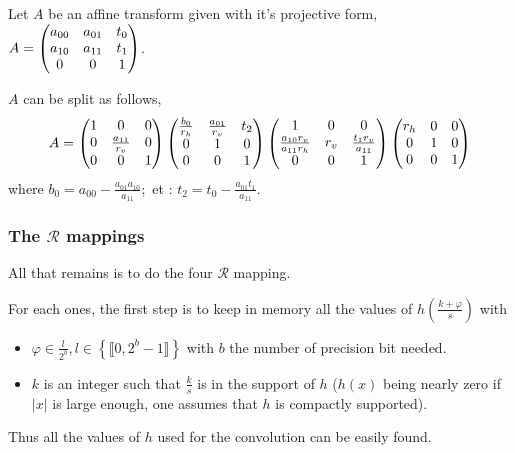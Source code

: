 		\begin{prop}
		\label{propositionDecompositionAffinite}
		Let $A$ be an affine transform given with it's projective form, $A = \begin{pmatrix} a_{00} & a_{01} & t_0\\ a_{10} & a_{11} & t_1\\ 0&0&1 \end{pmatrix}$.
		
		$A$ can be split as follows,
		\[
			A = 
			\begin{pmatrix} 1 & 0 & 0\\ 0 & \frac{a_{11}}{r_v} & 0\\ 0 & 0 & 1 \end{pmatrix}
			\begin{pmatrix} \frac{b_{0}}{r_h} & \frac{a_{01}}{r_v} & t_2\\ 0 & 1 & 0\\ 0 & 0 & 1 \end{pmatrix}
			\begin{pmatrix} 1 & 0 & 0\\ \frac{a_{10}r_v}{a_{11}r_h} & r_v & \frac{t_1r_v}{a_{11}}\\ 0 & 0 & 1 \end{pmatrix}
			\begin{pmatrix} r_h & 0 & 0\\ 0 & 1 & 0\\ 0 & 0 & 1 \end{pmatrix}
		\]
where $b_0 = a_{00} - \frac{a_{01}a_{10}}{a_{11}};$ et : $t_2 = t_0 - \frac{a_{01}t_1}{a_{11}}$.
\end{prop}
	\subsubsection{The $\mathcal R$ mappings}
		
		All that remains is to do the four $\mathcal R$ mapping.
		
		For each ones, the first step is to keep in memory all the values of $h(\frac{k+\varphi}{s})$ with
		
\begin{itemize}
		\item $\varphi \in  \frac{l}{2^b}, l \in \left\lbrace \llbracket 0,2^b-1\rrbracket \right\rbrace$ with $b$ the number of precision bit needed.
		\item $k$ is an integer such that $\frac{k}{s}$ is in the support of $h$ ($h(x)$ being nearly zero if $|x|$ is large enough, one assumes that $h$ is compactly supported).
		\end{itemize}
		Thus all the values of $h$ used for the convolution can be easily found.



